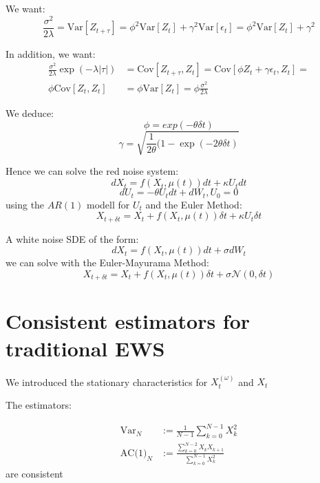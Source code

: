 \documentclass[%
thesis=student,%
coverpage=false,%
titlepage=false,%
headmarks=true, %
german,%
font=libertine, %
math=newpxtx, %
BCOR=5mm,%
coverBCOR=11mm%
]{tumbook}
\begin{document}
We want: 
    \begin{equation*}
        \frac{\sigma^2}{2\lambda} = \text{Var}[Z_{t+\tau}] = \phi ^2 \text{Var}[Z_{t}] + \gamma ^2 \text{Var}[\epsilon_{t}] = \phi ^2 \text{Var}[Z_{t}] + \gamma ^2
    \end{equation*}


In addition, we want: 
  \begin{align*} 
      \frac{\sigma ^2}{2\lambda}\exp(-\lambda\lvert \tau \rvert) &= \text{Cov}[Z_{t+\tau},Z_{t}] = \text{Cov}[\phi Z_{t} + \gamma \epsilon_{t}, Z_{t}] = \\
      \phi\text{Cov}[Z_{t},Z_{t}] &= \phi \text{Var}[Z_{t}] = \phi \frac{\sigma^2}{2\lambda}
  \end{align*}


We deduce: 
    \[
        \phi = exp(-\theta\delta t)
    \]
    \[
        \gamma = \sqrt{\frac{1}{2\theta}(1-\exp(-2\theta\delta t)}
    \]


Hence we can solve the red noise system:
        \[ 
             dX_{t} = f(X_{t},\mu(t))dt + \kappa U_{t}dt 
        \]
        \[
             dU_{t} = -\theta U_{t}dt + dW_{t}, U_{0} = 0
        \]
        using the $AR(1)$ modell for $U_{t}$ and the Euler Method:
        \[
            X_{t+\delta t} = X_{t} + f(X_{t},\mu(t))\delta t + \kappa U_{t}\delta t
        \]


A white noise SDE of the form: 
        \[
        dX_{t} = f(X_{t},\mu(t))dt + \sigma dW_{t}
        \]
        we can solve with the Euler-Mayurama Method: 
        \[
        X_{t+\delta t} = X_{t} + f(X_{t},\mu(t))\delta t + \sigma\mathcal{N}(0,\delta t)
        \]

\chapter{Consistent estimators for traditional EWS}

We introduced the stationary characteristics  for $X_{t}^{(\omega)}$ and $X_{t}$

The estimators:

\begin{subequations}
        \begin{align*}
            \text{Var}_{N} &:= \frac{1}{N-1}\sum_{k=0}^{N-1}X_{k}^{2} \\
            \text{AC(1)}_{N} &:= \frac{\sum_{k=0}^{N-2}X_{k}X_{k+1}}{\sum_{k=0}^{N-1}X_{k}^{2}}
        \end{align*}
    \end{subequations}
    are consistent 
\end{document}
